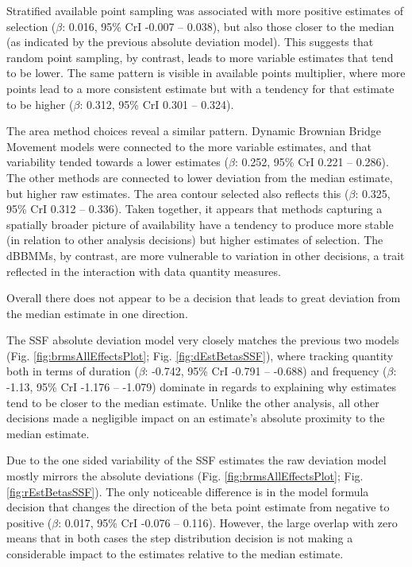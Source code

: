 \documentclass[10pt,a4paper]{article}
\begin{document}
Stratified available point sampling was associated with more positive estimates of selection (\(\beta\): 0.016, 95\% CrI -0.007 -- 0.038), but also those closer to the median (as indicated by the previous absolute deviation model).
This suggests that random point sampling, by contrast, leads to more variable estimates that tend to be lower.
The same pattern is visible in available points multiplier, where more points lead to a more consistent estimate but with a tendency for that estimate to be higher (\(\beta\): 0.312, 95\% CrI 0.301 -- 0.324).

The area method choices reveal a similar pattern.
Dynamic Brownian Bridge Movement models were connected to the more variable estimates, and that variability tended towards a lower estimates (\(\beta\): 0.252, 95\% CrI 0.221 -- 0.286).
The other methods are connected to lower deviation from the median estimate, but higher raw estimates.
The area contour selected also reflects this (\(\beta\): 0.325, 95\% CrI 0.312 -- 0.336).
Taken together, it appears that methods capturing a spatially broader picture of availability have a tendency to produce more stable (in relation to other analysis decisions) but higher estimates of selection.
The dBBMMs, by contrast, are more vulnerable to variation in other decisions, a trait reflected in the interaction with data quantity measures.

Overall there does not appear to be a decision that leads to great deviation from the median estimate in one direction.

The SSF absolute deviation model very closely matches the previous two models (Fig. \ref{fig:brmsAllEffectsPlot}; Fig. \ref{fig:dEstBetasSSF}), where tracking quantity both in terms of duration (\(\beta\): -0.742, 95\% CrI -0.791 -- -0.688) and frequency (\(\beta\): -1.13, 95\% CrI -1.176 -- -1.079) dominate in regards to explaining why estimates tend to be closer to the median estimate.
Unlike the other analysis, all other decisions made a negligible impact on an estimate's absolute proximity to the median estimate.

Due to the one sided variability of the SSF estimates the raw deviation model mostly mirrors the absolute deviations (Fig. \ref{fig:brmsAllEffectsPlot}; Fig. \ref{fig:rEstBetasSSF}).
The only noticeable difference is in the model formula decision that changes the direction of the beta point estimate from negative to positive (\(\beta\): 0.017, 95\% CrI -0.076 -- 0.116).
However, the large overlap with zero means that in both cases the step distribution decision is not making a considerable impact to the estimates relative to the median estimate.
\end{document}
